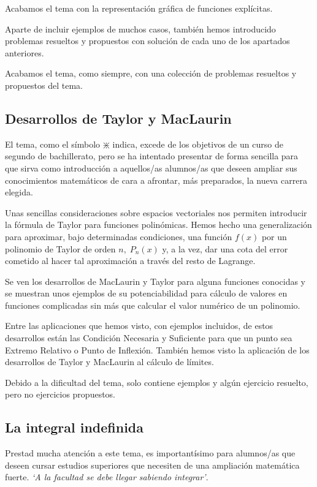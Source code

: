 Acabamos el tema con la representación gráfica de funciones explícitas.

Aparte de incluir ejemplos de muchos casos, también hemos introducido problemas resueltos y propuestos con solución de cada uno de los apartados anteriores.

Acabamos el tema, como siempre, con una colección de problemas resueltos y propuestos del tema.

\subsection{Desarrollos de Taylor y MacLaurin}

El tema, como el símbolo $\divideontimes$ indica, excede de los objetivos de un curso de segundo de bachillerato, pero se ha intentado presentar de forma sencilla para que sirva como introducción a aquellos/as alumnos/as que deseen ampliar sus conocimientos matemáticos de cara a afrontar, más preparados, la nueva carrera elegida. 

Unas sencillas consideraciones sobre espacios vectoriales nos permiten introducir la fórmula de Taylor para funciones polinómicas. Hemos hecho una generalización para aproximar, bajo determinadas condiciones, una función $f(x)$ por un polinomio de Taylor de orden $n, \; P_n(x)$ y, a la vez, dar una cota del error cometido al hacer tal aproximación a través del resto de Lagrange.

Se ven los desarrollos de MacLaurin y Taylor para alguna funciones conocidas y se muestran unos ejemplos de su potenciabilidad para cálculo de valores en funciones complicadas sin más que calcular el valor numérico de un polinomio.

Entre las aplicaciones que hemos visto, con ejemplos incluidos, de estos desarrollos están las Condición Necesaria y Suficiente  para que un punto sea Extremo Relativo o Punto de Inflexión. También hemos visto la aplicación de los desarrollos de Taylor y MacLaurin al cálculo de límites.

Debido a la dificultad del tema, solo contiene ejemplos y algún ejercicio resuelto, pero no ejercicios propuestos.

\subsection{La integral indefinida}

Prestad mucha atención a este tema, es importantísimo para alumnos/as que deseen cursar estudios superiores que necesiten de una ampliación matemática fuerte. \emph{`A la facultad se debe llegar sabiendo integrar'}.

